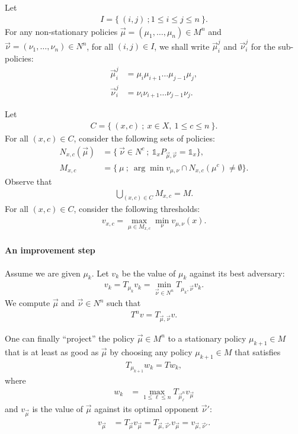 \documentclass{article}
\def\1{{\mathds 1}}
\begin{document}
Let
\begin{align}
  I = \{~ (i,j) ~; 1 \le i \le j \le n ~\}.
\end{align}
For any non-stationary policies $\vec\mu = (\mu_1,\dots,\mu_n) \in M^n$ and $\vec\nu =(\nu_1,\dots,\nu_n) \in N^n$, for all $(i,j) \in I$, we shall write $\vec\mu_i^j$ and $\vec\nu_i^j$ for the sub-policies:
\begin{align}
  \vec\mu_i^j &= \mu_i \mu_{i+1} \dots \mu_{j-1} \mu_{j}, \\
  \vec\nu_i^j &= \nu_i \nu_{i+1} \dots \nu_{j-1} \nu_{j}.
\end{align}

Let
\begin{align}
  C = \{~ (x,c) ~;~ x \in X,~ 1 \le c \le n ~\}.
\end{align}
For all $(x,c) \in C$, consider the following sets of policies:
\begin{align}
  N_{x,c}(\vec\mu) & = \{~ \vec\nu \in N^c ~;~ \1_x P_{\vec\mu,\vec\nu} = \1_x \}, \\
  M_{x,c} &= \{~ \mu ~;~ \arg\min v_{\mu,\nu} \cap N_{x,c}(\mu^c) \neq \emptyset \}.
\end{align}
Observe that
\begin{align}
  \bigcup_{(x,c) \in C} M_{x,c} = M.
\end{align}
For all $(x,c) \in C$, consider the following thresholds:
\begin{align}
  v_{x,c} = \max_{\mu \in M_{x,c}} \min_\nu v_{\mu,\nu}(x).
\end{align}


\paragraph{An improvement step}

Assume we are given $\mu_k$. Let $v_k$ be the value of $\mu_k$ against its best adversary:
\begin{align}
v_k = T_{\mu_k} v_k = \min_{\vec\nu \in N^n} T_{\mu_k,\vec\nu} v_k.
\end{align}
We compute $\vec\mu$ and $\vec\nu \in N^n$ such that
\begin{align}
  T^n v = T_{\vec\mu,\vec\nu}v.
\end{align}

One can finally ``project'' the policy $\vec\mu \in M^n$ to a stationary policy $\mu_{k+1} \in M$ that is at least as good as $\vec\mu$ by choosing any policy $\mu_{k+1} \in M$ that satisfies
\begin{align}
T_{\mu_{k+1}} w_k = T w_k,
\end{align}
where
\begin{align}
  w_k &= \max_{1 \le \ell \le n} T_{\vec\mu_\ell^n} v_{\vec\mu}
\end{align}
and $v_{\vec\mu}$ is the value of $\vec\mu$ against its optimal opponent $\vec\nu'$:
\begin{align}
  v_{\vec\mu} &= T_{\vec\mu} v_{\vec\mu} = T_{\vec\mu,\vec\nu'} v_{\vec\mu} = v_{\vec\mu,\vec\nu'}.
\end{align}
\end{document}
